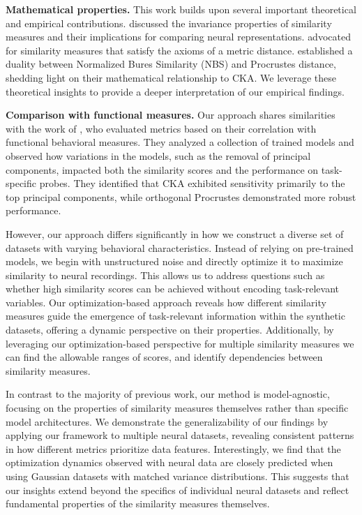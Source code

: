 \documentclass{article} %
\begin{document}
\textbf{Mathematical properties.} This work builds upon several important theoretical and empirical contributions. \citet{Kornblith2019} discussed the invariance properties of similarity measures and their implications for comparing neural representations. \citet{Williams2021} advocated for similarity measures that satisfy the axioms of a metric distance. \citet{harvey2023duality} established a duality between Normalized Bures Similarity (NBS) and Procrustes distance, shedding light on their mathematical relationship to CKA. We leverage these theoretical insights to provide a deeper interpretation of our empirical findings.




\textbf{Comparison with functional measures.} Our approach shares similarities with the work of \citet{ding2021grounding}, who evaluated metrics based on their correlation with functional behavioral measures.
They analyzed a collection of trained models and observed how variations in the models, such as the removal of principal components, impacted both the similarity scores and the performance on task-specific probes. 
They identified that CKA exhibited sensitivity primarily to the top principal components, while orthogonal Procrustes demonstrated more robust performance.

However, our approach differs significantly in how we construct a diverse set of datasets with varying behavioral characteristics. 
Instead of relying on pre-trained models, we begin with unstructured noise and directly optimize it to maximize similarity to neural recordings. 
This allows us to address questions such as whether high similarity scores can be achieved without encoding task-relevant variables.
Our optimization-based approach reveals how different similarity measures guide the emergence of task-relevant information within the synthetic datasets, offering a dynamic perspective on their properties. Additionally, by leveraging our optimization-based perspective for multiple similarity measures we can find the allowable ranges of scores, and identify dependencies between similarity measures.

In contrast to the majority of previous work, our method is model-agnostic, focusing on the properties of similarity measures themselves rather than specific model architectures. 
We demonstrate the generalizability of our findings by applying our framework to multiple neural datasets, revealing consistent patterns in how different metrics prioritize data features. Interestingly, we find that the optimization dynamics observed with neural data are closely predicted when using Gaussian datasets with matched variance distributions. This suggests that our insights extend beyond the specifics of individual neural datasets and reflect fundamental properties of the similarity measures themselves.
\end{document}
